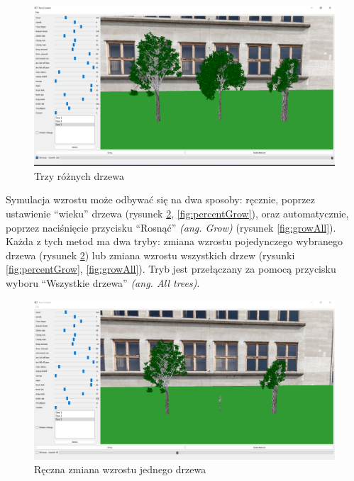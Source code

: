 \documentclass[a4paper,12pt,twoside]{book} %
\begin{document}
\begin{figure}[H]
	\centering\includegraphics[width=15.5cm]{grafika/program/beforeGrow.png}
	\caption{Trzy różnych drzewa}
    \label{fig:beforeGrow}
\end{figure}

Symulacja wzrostu może odbywać się na dwa sposoby: 
ręcznie, poprzez ustawienie ``wieku'' drzewa (rysunek \ref{fig:oneTree}, \ref{fig:percentGrow}), 
oraz automatycznie, poprzez naciśnięcie przycisku ``Rosnąć'' \textit{(ang. Grow)} (rysunek \ref{fig:growAll}). 
Każda z tych metod ma dwa tryby: zmiana wzrostu pojedynczego 
wybranego drzewa (rysunek \ref{fig:oneTree}) lub zmiana wzrostu wszystkich drzew (rysunki \ref{fig:percentGrow}, \ref{fig:growAll}). 
Tryb jest przełączany za pomocą przycisku wyboru ``Wszystkie drzewa'' \textit{(ang. All trees)}. 

\begin{figure}[H]
	\centering\includegraphics[width=15.5cm]{grafika/program/oneTreeGrow.png}
	\caption{Ręczna zmiana wzrostu jednego drzewa}
    \label{fig:oneTree}
\end{figure}
\end{document}
